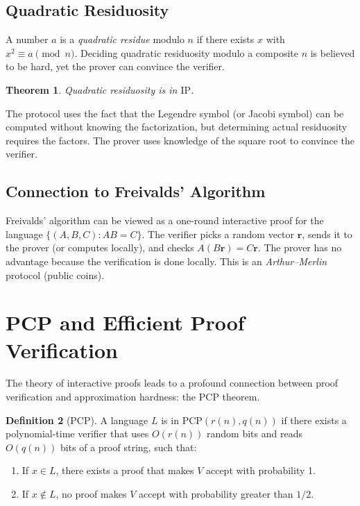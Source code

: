 \documentclass[twoside,12pt]{book}
\theoremstyle{plain}
\newtheorem{theorem}{Theorem}[chapter]
\theoremstyle{definition}
\newtheorem{definition}[theorem]{Definition}
\theoremstyle{remark}
\begin{document}
\subsection*{Quadratic Residuosity}

A number $a$ is a \emph{quadratic residue} modulo $n$ if there exists $x$ with $x^2 \equiv a \pmod{n}$. Deciding quadratic residuosity modulo a composite $n$ is believed to be hard, yet the prover can convince the verifier.

\begin{theorem}
Quadratic residuosity is in $\mathrm{IP}$.
\end{theorem}

The protocol uses the fact that the Legendre symbol (or Jacobi symbol) can be computed without knowing the factorization, but determining actual residuosity requires the factors. The prover uses knowledge of the square root to convince the verifier.

\subsection*{Connection to Freivalds' Algorithm}

Freivalds' algorithm can be viewed as a one-round interactive proof for the language $\{ (A, B, C) : AB = C \}$. The verifier picks a random vector $\mathbf{r}$, sends it to the prover (or computes locally), and checks $A(B\mathbf{r}) = C\mathbf{r}$. The prover has no advantage because the verification is done locally. This is an \emph{Arthur--Merlin} protocol (public coins).


\section{PCP and Efficient Proof Verification}
\label{sec:pcp}

The theory of interactive proofs leads to a profound connection between proof verification and approximation hardness: the PCP theorem.

\begin{definition}[PCP]
A language $L$ is in $\mathrm{PCP}(r(n), q(n))$ if there exists a polynomial-time verifier that uses $O(r(n))$ random bits and reads $O(q(n))$ bits of a proof string, such that:
\begin{enumerate}[label=(\roman*)]
\item If $x \in L$, there exists a proof that makes $V$ accept with probability 1.
\item If $x \notin L$, no proof makes $V$ accept with probability greater than $1/2$.
\end{enumerate}
\end{definition}
\end{document}
